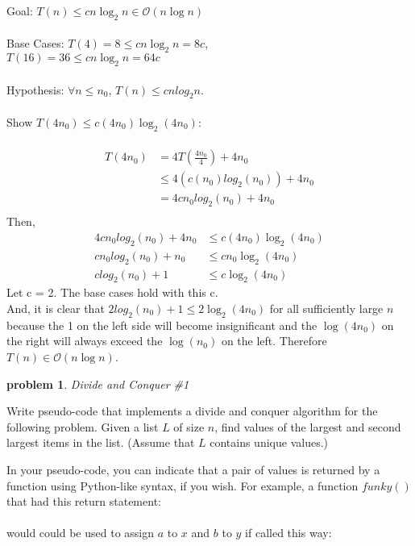 \documentclass[10pt]{article}
\newtheorem{problem}{\sc\color{cit}problem}
\begin{document}
\begin{enumerate}
    	Goal: $T(n) \leq cn\log_2{n} \in \mathcal{O}(n\log{n})$ \\ \\
    	Base Cases: $T(4) = 8 \leq cn\log_2{n} = 8c$, \\
    	\null \qquad \qquad \quad $T(16) = 36 \leq cn\log_2{n} = 64c$\\ \\
    	Hypothesis: $\forall n \leq n_0$, $T(n) \leq cnlog_2{n}$. \\ \\
    	Show $T(4n_0) \leq c(4n_0)\log_2{(4n_0)}$: \\ \\
    	\begin{align*}
    	    T(4n_0) &= 4T(\frac{4n_0}{4}) + 4n_0 \\
    	    &\leq 4\left(c(n_0)log_2{(n_0)}\right) + 4n_0 \\
    	    &= 4cn_0log_2{(n_0)} + 4n_0 \\
    	\end{align*}
        Then, 
    	\begin{align*}
    	    4cn_0log_2{(n_0)} + 4n_0 &\leq c(4n_0)\log_2{(4n_0)} \\
    	    cn_0log_2(n_0) + n_0 &\leq cn_0\log_2{(4n_0)} \\
    	    clog_2(n_0) + 1 &\leq c\log_2{(4n_0)}
    	\end{align*}
    	Let c = 2. The base cases hold with this c. \\
    	And, it is clear that $2log_2(n_0) + 1 \leq 2\log_2{(4n_0)}$ for all sufficiently large $n$ because the 1 on the left side will become insignificant and the $\log(4n_0)$ on the right will always exceed the $\log(n_0)$ on the left.
    	Therefore $T(n) \in \mathcal{O}(n\log{n})$.
      \end{enumerate}   
      
      
\pagebreak

 \begin{problem} Divide and Conquer \#1\end{problem}
    
\noindent
Write pseudo-code that implements a divide and conquer algorithm for the following problem.  Given a list $L$ of size $n$,  find values of the largest and second largest items in the list.  (Assume that $L$ contains unique values.)
	
	In your pseudo-code,  you can indicate that a pair of values is returned by a function using Python-like syntax, if you wish.  For example,  a function $funky()$ that had this return statement: \\
	\hspace*{3em}{\tt return a, b} \\
	would could be used to assign $a$ to $x$ and $b$ to $y$ if called this way: \\
	\hspace*{3em}{\tt (x, y) = funky()} \\
	
\end{document}
